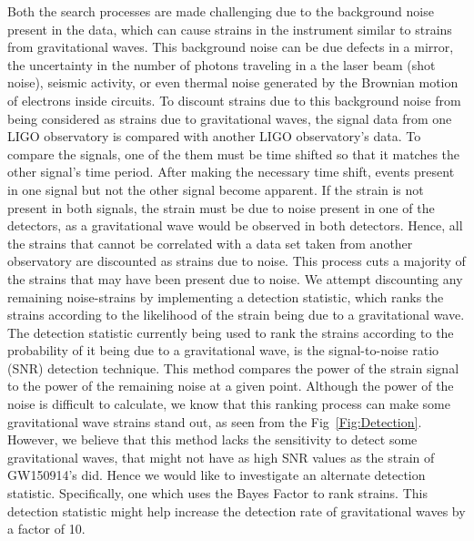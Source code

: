 \documentclass{article}
\begin{document}
  
  \indent Both the search processes are made challenging due to the background noise present in the data, which can cause strains in the instrument similar to strains from gravitational waves. This background noise can be due defects in a mirror, the uncertainty in the number of photons traveling in a the laser beam (shot noise), seismic activity, or even thermal noise generated by the Brownian motion of electrons inside circuits. To discount strains due to this background noise from being considered as strains due to gravitational waves, the signal data from one LIGO observatory is compared with another LIGO observatory's data. To compare the signals, one of the them must be time shifted so that it matches the other signal's time period. After making the necessary time shift, events present in one signal but not the other signal become apparent. If the strain is not present in both signals, the strain must be due to noise present in one of the detectors, as a gravitational wave would be observed in both detectors. Hence, all the strains that cannot be correlated with a data set taken from another observatory are discounted as strains due to noise. This process cuts a majority of the strains that may have been present due to noise. We attempt discounting any remaining noise-strains by implementing a detection statistic, which ranks the strains according to the likelihood of the strain being due to a gravitational wave.\\
  
  
  The detection statistic currently being used to rank the strains according to the probability of it being due to a gravitational wave, is the signal-to-noise ratio (SNR) detection technique. This method compares the power of the strain signal to the power of the remaining noise at a given point. Although the power of the noise is difficult to calculate, we know that this ranking process can make some gravitational wave strains stand out, as seen from the Fig~\ref{Fig:Detection}.  However, we believe that this method lacks the sensitivity to detect some gravitational waves, that might not have as high SNR  values as the strain of GW150914's did. Hence we would like to investigate an alternate detection statistic. Specifically, one which uses the Bayes Factor to rank strains. This detection statistic might help increase the detection rate of gravitational waves by a factor of 10.  
   
\end{document}
